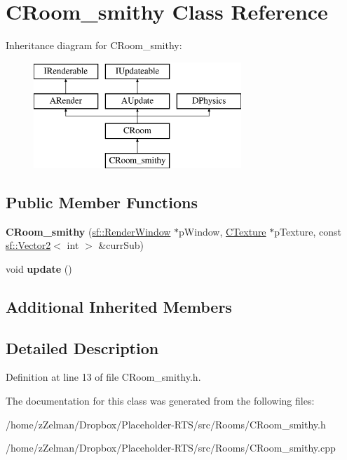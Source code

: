 \hypertarget{classCRoom__smithy}{\section{C\-Room\-\_\-smithy Class Reference}
\label{classCRoom__smithy}
}
Inheritance diagram for C\-Room\-\_\-smithy\-:\begin{figure}[H]
\begin{center}
\leavevmode
\includegraphics[height=4.000000cm]{classCRoom__smithy}
\end{center}
\end{figure}
\subsection*{Public Member Functions}
\begin{DoxyCompactItemize}
\item 
\hypertarget{classCRoom__smithy_a7fcd459ca3fe07f3f9cafcf4a48a36d2}{{\bfseries C\-Room\-\_\-smithy} (\hyperlink{classsf_1_1RenderWindow}{sf\-::\-Render\-Window} $\ast$p\-Window, \hyperlink{classCTexture}{C\-Texture} $\ast$p\-Texture, const \hyperlink{classsf_1_1Vector2}{sf\-::\-Vector2}$<$ int $>$ \&curr\-Sub)}\label{classCRoom__smithy_a7fcd459ca3fe07f3f9cafcf4a48a36d2}

\item 
\hypertarget{classCRoom__smithy_a5e7be1eed9a469748fcd6ed7ecd3c772}{void {\bfseries update} ()}\label{classCRoom__smithy_a5e7be1eed9a469748fcd6ed7ecd3c772}

\end{DoxyCompactItemize}
\subsection*{Additional Inherited Members}


\subsection{Detailed Description}


Definition at line 13 of file C\-Room\-\_\-smithy.\-h.



The documentation for this class was generated from the following files\-:\begin{DoxyCompactItemize}
\item 
/home/z\-Zelman/\-Dropbox/\-Placeholder-\/\-R\-T\-S/src/\-Rooms/C\-Room\-\_\-smithy.\-h\item 
/home/z\-Zelman/\-Dropbox/\-Placeholder-\/\-R\-T\-S/src/\-Rooms/C\-Room\-\_\-smithy.\-cpp\end{DoxyCompactItemize}
